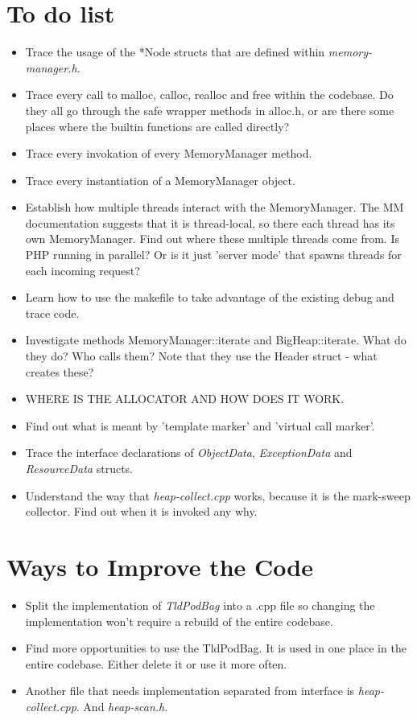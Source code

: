 \section{To do list}
\begin{itemize}
  \item Trace the usage of the *Node structs that are defined within \emph{memory-manager.h}.
  \item Trace every call to malloc, calloc, realloc and free within the codebase. Do they all go through the safe wrapper methods in alloc.h, or are there some places where the builtin functions are called directly?
  \item Trace every invokation of every MemoryManager method.
  \item Trace every instantiation of a MemoryManager object.
  \item Establish how multiple threads interact with the MemoryManager. The MM documentation suggests that it is thread-local, so there each thread has its own MemoryManager. Find out where these multiple threads come from. Is PHP running in parallel? Or is it just 'server mode' that spawns threads for each incoming request?
  \item Learn how to use the makefile to take advantage of the existing debug and trace code.
  \item Investigate methods MemoryManager::iterate and BigHeap::iterate. What do they do? Who calls them? Note that they use the Header struct - what creates these?
  \item WHERE IS THE ALLOCATOR AND HOW DOES IT WORK.
  \item Find out what is meant by 'template marker' and 'virtual call marker'.
  \item Trace the interface declarations of \emph{ObjectData}, \emph{ExceptionData} and \emph{ResourceData} structs.
  \item Understand the way that \emph{heap-collect.cpp} works, because it is the mark-sweep collector. Find out when it is invoked any why.
\end{itemize}

\section{Ways to Improve the Code}
\begin{itemize}
  \item Split the implementation of \emph{TldPodBag} into a .cpp file so changing the implementation won't require a rebuild of the entire codebase.
  \item Find more opportunities to use the TldPodBag. It is used in one place in the entire codebase. Either delete it or use it more often.
  \item Another file that needs implementation separated from interface is \emph{heap-collect.cpp}. And \emph{heap-scan.h}.
\end{itemize}

